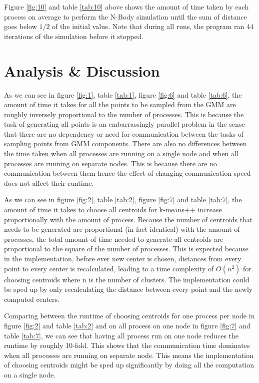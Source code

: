 \documentclass{article}
\begin{document}
Figure \ref{fig:10} and table \ref{tab:10} above shows the amount of time taken by each process on
average to perform the N-Body simulation until the sum of distance goes below \(1/2\) of the initial
value. Note that during all runs, the program ran 44 iterations of the simulation before it stopped.

\section*{Analysis \& Discussion}
As we can see in figure \ref{fig:1}, table \ref{tab:1}, figure \ref{fig:6} and table \ref{tab:6},
the amount of time it takes for all the points to be sampled from the GMM are roughly inversely
proportional to the number of processes. This is because the task of generating all points is an
embarrassingly parallel problem in the sense that there are no dependency or need for communication
between the tasks of sampling points from GMM components. There are also no differences between the
time taken when all processes are running on a single node and when all processes are running on
separate nodes. This is because there are no communication between them hence the effect of changing
communication speed does not affect their runtime.

As we can see in figure \ref{fig:2}, table \ref{tab:2}, figure \ref{fig:7} and table \ref{tab:7},
the amount of time it takes to choose all centroids for k-means++ increase proportionally with the
amount of process. Because the number of centroids that needs to be generated are proportional (in
fact identical) with the amount of processes, the total amount of time needed to generate all
centroids are proportional to the square of the number of processes. This is expected because in the
implementation, before ever new center is chosen, distances from every point to every center is
recalculated, leading to a time complexity of \(O(n^2)\) for choosing centroids where n is the
number of clusters. The implementation could be sped up by only recalculating the distance between
every point and the newly computed centers.

Comparing between the runtime of choosing centroids for one process per node in figure \ref{fig:2}
and table \ref{tab:2} and on all process on one node in figure \ref{fig:7} and table \ref{tab:7}, we
can see that having all process run on one node reduces the runtime by roughly 10-fold. This shows
that the communication time dominates when all processes are running on separate node. This means
the implementation of choosing centroids might be sped up significantly by doing all the computation
on a single node.
\end{document}
